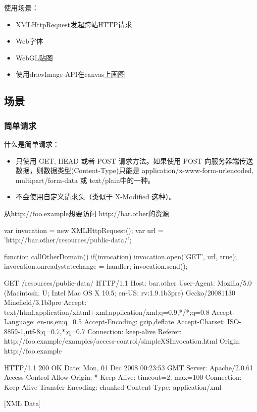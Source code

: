 使用场景：
\begin{itemize}
\item XMLHttpRequest发起跨站HTTP请求
\item Web字体
\item WebGL贴图
\item 使用drawImage API在canvas上画图
\end{itemize}


\subsection{场景}

\subsubsection*{简单请求}

什么是简单请求：
\begin{itemize}
\item 只使用 GET, HEAD 或者 POST 请求方法。如果使用 POST 向服务器端传送数据，则数据类型(Content-Type)只能是 application/x-www-form-urlencoded, multipart/form-data 或 text/plain中的一种。
\item 不会使用自定义请求头（类似于 X-Modified 这种）。
\end{itemize}

从http://foo.example想要访问 http://bar.other的资源

\begin{JavaScript}
var invocation = new XMLHttpRequest();
var url = 'http://bar.other/resources/public-data/';
   
function callOtherDomain() {
  if(invocation) {    
    invocation.open('GET', url, true);
    invocation.onreadystatechange = handler;
    invocation.send(); 
  }
}
\end{JavaScript}

\begin{HTML5}
GET /resources/public-data/ HTTP/1.1
Host: bar.other
User-Agent: Mozilla/5.0 (Macintosh; U; Intel Mac OS X 10.5; en-US; rv:1.9.1b3pre) Gecko/20081130 Minefield/3.1b3pre
Accept: text/html,application/xhtml+xml,application/xml;q=0.9,*/*;q=0.8
Accept-Language: en-us,en;q=0.5
Accept-Encoding: gzip,deflate
Accept-Charset: ISO-8859-1,utf-8;q=0.7,*;q=0.7
Connection: keep-alive
Referer: http://foo.example/examples/access-control/simpleXSInvocation.html
Origin: http://foo.example


HTTP/1.1 200 OK
Date: Mon, 01 Dec 2008 00:23:53 GMT
Server: Apache/2.0.61 
Access-Control-Allow-Origin: *
Keep-Alive: timeout=2, max=100
Connection: Keep-Alive
Transfer-Encoding: chunked
Content-Type: application/xml

[XML Data]
\end{HTML5}


